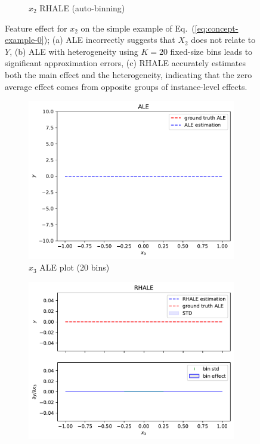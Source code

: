 \documentclass{ecai}  %
\begin{document}
\begin{figure}
\begin{subfigure}{.33\textwidth}
  \caption{\(x_2\) RHALE (auto-binning)}
  \label{fig:concept-figure-0-subfig-3}
\end{subfigure}
\caption{Feature effect for \(x_2\) on the simple example of Eq.~(\ref{eq:concept-example-0}); (a) ALE incorrectly suggests that \(X_2\) does not relate to \(Y\), (b) ALE with heterogeneity using \(K=20\) fixed-size bins leads to significant approximation errors, (c) RHALE accurately estimates both the main effect and the heterogeneity, indicating that the zero average effect comes from opposite groups of instance-level effects.}
\label{fig:concept-figure-0}
\end{figure}

\begin{figure}
  \centering
\begin{subfigure}{.23\textwidth}
  \centering
  \includegraphics[width=1\textwidth]{concept_figure_0/ale_N_100_feat_2_bins_100}
  \caption{\(x_3\) ALE plot (20 bins)}
  \label{fig:concept-figure-1-subfig-0}
\end{subfigure}
\begin{subfigure}{.23\textwidth}
  \centering
  \includegraphics[width=1\textwidth]{concept_figure_0/rhale_N_100_feat_2}

\end{subfigure}
\end{figure}
\end{document}
